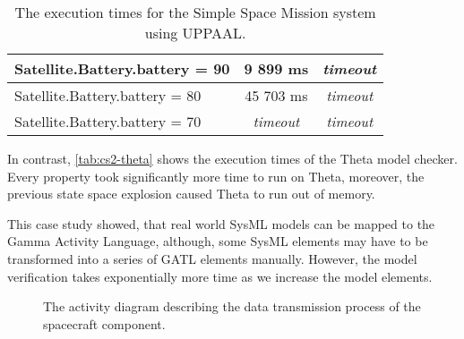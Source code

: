 \begin{table}[!ht]
\begin{tabular}{|l|c|c|}
		Satellite.Battery.battery = 90         & 9 899 ms                              & \textit{timeout}               \\ \hline
		Satellite.Battery.battery = 80         & 45 703 ms                              & \textit{timeout}               \\ \hline
		Satellite.Battery.battery = 70         & \textit{timeout}                              & \textit{timeout}               \\ \hline
	\end{tabular}
	\caption{The execution times for the Simple Space Mission system using UPPAAL.}
	\label{tab:cs2-uppaal}
\end{table}

In contrast, \autoref{tab:cs2-theta} shows the execution times of the Theta model checker. Every property took significantly more time to run on Theta, moreover, the previous state space explosion caused Theta to run out of memory.

This case study showed, that real world SysML models can be mapped to the Gamma Activity Language, although, some SysML elements may have to be transformed into a series of GATL elements manually. However, the model verification takes exponentially more time as we increase the model elements.

\begin{figure}[]
	\centering
	
	\caption{The activity diagram describing the data transmission process of the spacecraft component.}
	\label{fig:transmit_data}
\end{figure}
